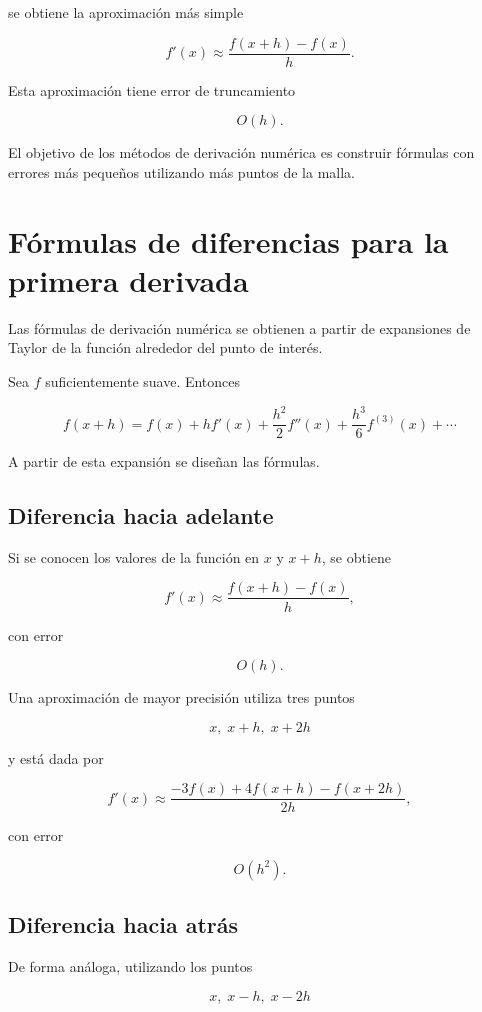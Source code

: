 \documentclass[12pt,a4paper]{article}
\theoremstyle{definition}
\theoremstyle{remark}
\begin{document}
se obtiene la aproximación más simple

\[
f'(x) \approx \frac{f(x+h)-f(x)}{h}.
\]

Esta aproximación tiene error de truncamiento

\[
O(h).
\]

El objetivo de los métodos de derivación numérica es construir fórmulas con
errores más pequeños utilizando más puntos de la malla.



\section{Fórmulas de diferencias para la primera derivada}

Las fórmulas de derivación numérica se obtienen a partir de expansiones de Taylor
de la función alrededor del punto de interés.


Sea $f$ suficientemente suave. Entonces

\[
f(x+h) = f(x) + h f'(x) + \frac{h^2}{2}f''(x) + \frac{h^3}{6}f^{(3)}(x) + \cdots
\]

A partir de esta expansión se diseñan las fórmulas.

\subsection{Diferencia hacia adelante}

Si se conocen los valores de la función en $x$ y $x+h$, se obtiene

\[
f'(x) \approx
\frac{f(x+h)-f(x)}{h},
\]

con error

\[
O(h).
\]

Una aproximación de mayor precisión utiliza tres puntos

\[
x,\; x+h,\; x+2h
\]

y está dada por

\[
f'(x) \approx
\frac{-3f(x)+4f(x+h)-f(x+2h)}{2h},
\]

con error

\[
O(h^2).
\]

\subsection{Diferencia hacia atrás}

De forma análoga, utilizando los puntos

\[
x,\; x-h,\; x-2h
\]
\end{document}
